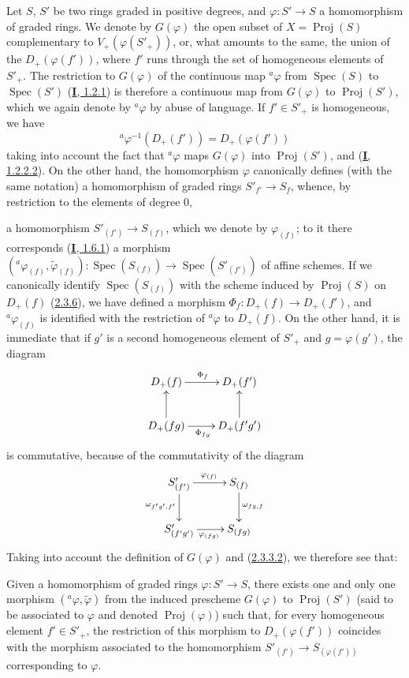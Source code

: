 \begin{env}[2.8.1]
\label{II.2.8.1}
Let $S$, $S'$ be two rings graded in positive degrees, and
$\varphi:S'\to S$ a homomorphism of graded rings. We denote by
$G(\varphi)$ the open subset of $X=\operatorname{Proj}(S)$ complementary to
$V_+(\varphi(S'_+))$, or, what amounts to the same, the union of the
$D_+(\varphi(f'))$, where $f'$ runs through the set of homogeneous elements of
$S'_+$. The restriction to $G(\varphi)$ of the continuous map
${}^a\varphi$ from $\operatorname{Spec}(S)$ to $\operatorname{Spec}(S')$
(\hyperref[I.1.2.1]{\textbf{I}, 1.2.1}) is therefore a continuous map from
$G(\varphi)$ to $\operatorname{Proj}(S')$, which we again denote by
${}^a\varphi$ by abuse of language. If $f'\in S'_+$ is homogeneous, we have
\[
\label{II.2.8.1.1}
  {}^a\varphi^{-1}(D_+(f'))=D_+(\varphi(f'))
\tag{2.8.1.1}
\]
taking into account the fact that ${}^a\varphi$ maps $G(\varphi)$ into
$\operatorname{Proj}(S')$, and (\hyperref[I.1.2.2.2]{\textbf{I}, 1.2.2.2}). On the
other hand, the homomorphism $\varphi$ canonically defines (with the same
notation) a homomorphism of graded rings $S'_{f'}\to S_f$, whence, by
restriction to the elements of degree $0$,

a homomorphism $S'_{(f')}\to S_{(f)}$, which we denote by
$\varphi_{(f)}$; to it there corresponds
(\hyperref[I.1.6.1]{\textbf{I}, 1.6.1}) a morphism
$({}^a\varphi_{(f)},\widetilde{\varphi}_{(f)}):
\operatorname{Spec}(S_{(f)})\to\operatorname{Spec}(S'_{(f')})$ of affine
schemes. If we canonically identify $\operatorname{Spec}(S_{(f)})$ with the
scheme induced by $\operatorname{Proj}(S)$ on $D_+(f)$
(\hyperref[II.2.3.6]{2.3.6}), we have defined a morphism
$\Phi_f:D_+(f)\to D_+(f')$, and ${}^a\varphi_{(f)}$ is identified with the
restriction of ${}^a\varphi$ to $D_+(f)$. On the other hand, it is immediate
that if $g'$ is a second homogeneous element of $S'_+$ and $g=\varphi(g')$,
the diagram
\[
  \xymatrix{
    D_+(f)\ar[r]^{\Phi_f} & D_+(f')\\
    D_+(fg)\ar[u]\ar[r]_{\Phi_{fg}} & D_+(f'g')\ar[u]
  }
\]
is commutative, because of the commutativity of the diagram
\[
  \xymatrix{
    S'_{(f')}\ar[r]^{\varphi_{(f)}}\ar[d]_{\omega_{f'g',f'}}
    & S_{(f)}\ar[d]^{\omega_{fg,f}}\\
    S'_{(f'g')}\ar[r]_{\varphi_{(fg)}} & S_{(fg)}
  }
\]
Taking into account the definition of $G(\varphi)$ and
(\hyperref[II.2.3.3.2]{2.3.3.2}), we therefore see that:
\end{env}

\begin{proposition}[2.8.2]
\label{II.2.8.2}
Given a homomorphism of graded rings $\varphi:S'\to S$, there exists one and
only one morphism $({}^a\varphi,\widetilde{\varphi})$ from the induced
prescheme $G(\varphi)$ to $\operatorname{Proj}(S')$ \textup{(said to be}
associated to $\varphi$ and denoted $\operatorname{Proj}(\varphi)$) such
that, for every homogeneous element $f'\in S'_+$, the restriction of this
morphism to $D_+(\varphi(f'))$ coincides with the morphism associated to the
homomorphism $S'_{(f')}\to S_{(\varphi(f'))}$ corresponding to $\varphi$.
\end{proposition}

